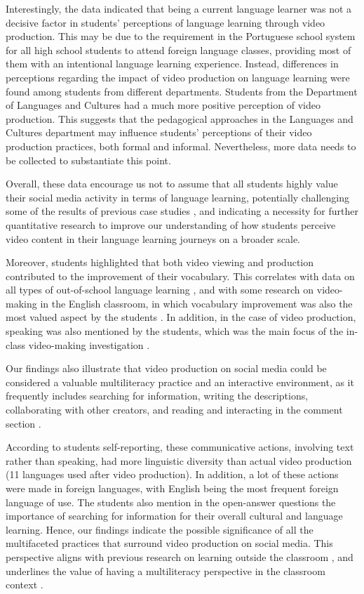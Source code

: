 Interestingly, the data indicated that being a current language learner was not a decisive factor in students' perceptions of language learning through video production. This may be due to the requirement in the Portuguese school system for all high school students to attend foreign language classes, providing most of them with an intentional language learning experience. Instead, differences in perceptions regarding the impact of video production on language learning were found among students from different departments. Students from the Department of Languages and Cultures had a much more positive perception of video production. This suggests that the pedagogical approaches in the Languages and Cultures department may influence students' perceptions of their video production practices, both formal and informal. Nevertheless, more data needs to be collected to substantiate this point.

Overall, these data encourage us not to assume that all students highly value their social media activity in terms of language learning, potentially challenging some of the results of previous case studies \cite{junior2020,zhang2022}, and indicating a necessity for further quantitative research to improve our understanding of how students perceive video content in their language learning journeys on a broader scale.

Moreover, students highlighted that both video viewing and production contributed to the improvement of their vocabulary. This correlates with data on all types of out-of-school language learning \cite{gonulal2019,soyoof2023}, and with some research on video-making in the English classroom, in which vocabulary improvement was also the most valued aspect by the students \cite{yeh2018}. In addition, in the case of video production, speaking was also mentioned by the students, which was the main focus of the in-class video-making investigation \cite{devana2021}.

Our findings also illustrate that video production on social media could be considered a valuable multiliteracy practice and an interactive environment, as it frequently includes searching for information, writing the descriptions, collaborating with other creators, and reading and interacting in the comment section \cite{cope2009}.

According to students self-reporting, these communicative actions, involving text rather than speaking, had more linguistic diversity than actual video production (11 languages used after video production). In addition, a lot of these actions were made in foreign languages, with English being the most frequent foreign language of use. The students also mention in the open-answer questions the importance of searching for information for their overall cultural and language learning. Hence, our findings indicate the possible significance of all the multifaceted practices that surround video production on social media. This perspective aligns with previous research on learning outside the classroom \cite{zhang2022}, and underlines the value of having a multiliteracy perspective in the classroom context \cite{yeh2018}.


